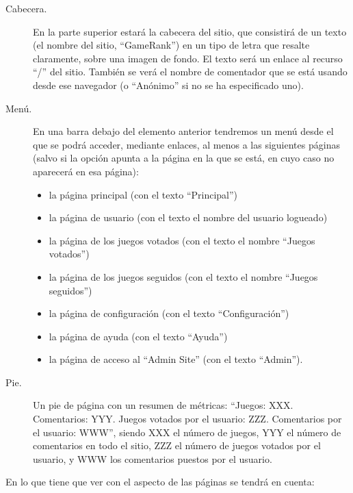 \begin{description}
\item[Cabecera.] En la parte superior estará la cabecera del sitio, que consistirá de un texto (el nombre del sitio, ``GameRank'') en un tipo de letra que resalte claramente, sobre una imagen de fondo. El texto será un enlace al recurso ``/'' del sitio. También se verá el nombre de comentador que se está usando desde ese navegador (o ``Anónimo'' si no se ha especificado uno).

\item[Menú.] En una barra debajo del elemento anterior tendremos un menú desde el que se podrá acceder, mediante enlaces, al menos a las siguientes páginas (salvo si la opción apunta a la página en la que se está, en cuyo caso no aparecerá en esa página):
  \begin{itemize}
  \item la página principal (con el texto ``Principal'')
  \item la página de usuario (con el texto el nombre del usuario logueado)
  \item la página de los juegos votados (con el texto el nombre ``Juegos votados'')
  \item la página de los juegos seguidos (con el texto el nombre ``Juegos seguidos'')
  \item la página de configuración (con el texto ``Configuración'')
  \item la página de ayuda (con el texto ``Ayuda'')
  \item la página de acceso al ``Admin Site'' (con el texto ``Admin''). 
  \end{itemize}

\item[Pie.] Un pie de página con un resumen de métricas: ``Juegos: XXX. Comentarios: YYY. Juegos votados por el usuario: ZZZ. Comentarios por el usuario: WWW'', siendo XXX el número de juegos, YYY el número de comentarios en todo el sitio, ZZZ el número de juegos votados por el usuario, y WWW los comentarios puestos por el usuario.
\end{description}
  
En lo que tiene que ver con el aspecto de las páginas se tendrá en cuenta:

